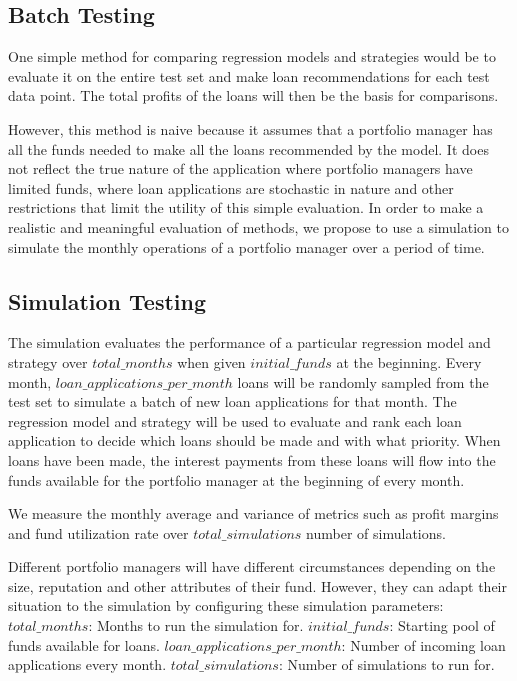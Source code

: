 \documentclass[a4paper]{article}
\theoremstyle{genius}
\begin{document}
\subsection{Batch Testing}
One simple method for comparing regression models and strategies would be to evaluate it on the entire test set and make loan recommendations for each test data point. The total profits of the loans will then be the basis for comparisons.

However, this method is naive because it assumes that a portfolio manager has all the funds needed to make all the loans recommended by the model. It does not reflect the true nature of the application where portfolio managers have limited funds, where loan applications are stochastic in nature and other restrictions that limit the utility of this simple evaluation. In order to make a realistic and meaningful evaluation of methods, we propose to use a simulation to simulate the monthly operations of a portfolio manager over a period of time.

\subsection{Simulation Testing}
The simulation evaluates the performance of a particular regression model and strategy over $total\_months$ when given $initial\_funds$ at the beginning. Every month, $loan\_applications\_per\_month$ loans will be randomly sampled from the test set to simulate a batch of new loan applications for that month. The regression model and strategy will be used to evaluate and rank each loan application to decide which loans should be made and with what priority. When loans have been made, the interest payments from these loans will flow into the funds available for the portfolio manager at the beginning of every month. 

We measure the monthly average and variance of metrics such as profit margins and fund utilization rate over $total\_simulations$ number of simulations.

Different portfolio managers will have different circumstances depending on the size, reputation and other attributes of their fund. However, they can adapt their situation to the simulation by configuring these simulation parameters:
\smallbreak
$total\_months$: Months to run the simulation for.
\smallbreak
$initial\_funds$: Starting pool of funds available for loans.
\smallbreak
$loan\_applications\_per\_month$: Number of incoming loan applications every month.
\smallbreak
$total\_simulations$: Number of simulations to run for.
\end{document}
